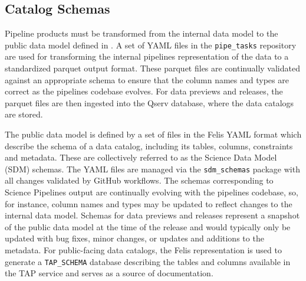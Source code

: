\subsection{Catalog Schemas}
\label{sec:schemas}

Pipeline products must be transformed from the internal data model to the public data model defined in \citet{LSE-163}.
A set of YAML files in the \texttt{pipe\_tasks} repository are used for transforming the internal pipelines representation of the data to a standardized parquet output format.
These parquet files are continually validated against an appropriate schema to ensure that the column names and types are correct as the pipelines codebase evolves.
For data previews and releases, the parquet files are then ingested into the Qserv database, where the data catalogs are stored.

The public data model is defined by a set of files in the Felis \citep{2024arXiv241209721M} YAML format which describe the schema of a data catalog, including its tables, columns, constraints and metadata.
These are collectively referred to as the Science Data Model (SDM) schemas.
The YAML files are managed via the \texttt{sdm\_schemas} package with all changes validated by GitHub workflows.
The schemas corresponding to Science Pipelines output are continually evolving with the pipelines codebase, so, for instance, column names and types may be updated to reflect changes to the internal data model.
Schemas for data previews and releases represent a snapshot of the public data model at the time of the release and would typically only be updated with bug fixes, minor changes, or updates and additions to the metadata.
For public-facing data catalogs, the Felis representation is used to generate a \texttt{TAP\_SCHEMA} database describing the tables and columns available in the TAP service \citep{2019ivoa.spec.0927D} and serves as a source of documentation.
